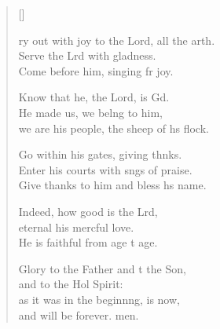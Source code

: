 \settowidth{\versewidth}{Cry out with joy to the Lord, all the earth. +}
\begin{verse}[\versewidth]
  \begin{patverse}
    ry out with joy to the Lord, all the arth.\Flex\\
Serve the Lrd with gladness.\Med\\
Come before him, singing fr joy.

Know that he, the Lord, is Gd.\Flex\\
He made us, we belng to him,\Med\\
we are his people, the sheep of h\pointup{\i}s flock.

Go within his gates, giving thnks.\Flex\\
Enter his courts with sngs of praise.\Med\\
Give thanks to him and bless h\pointup{\i}s name.

Indeed, how good is the Lrd,\Flex\\
eternal his merc\pointup{\i}ful love.\Med\\
He is faithful from age t age.

Glory to the Father and t the Son,\Med\\
and to the Hol Spirit:\\
as it was in the beginn\pointup{\i}ng, is now,\Med\\
and will be forever. men.
  \end{patverse}
\end{verse}

